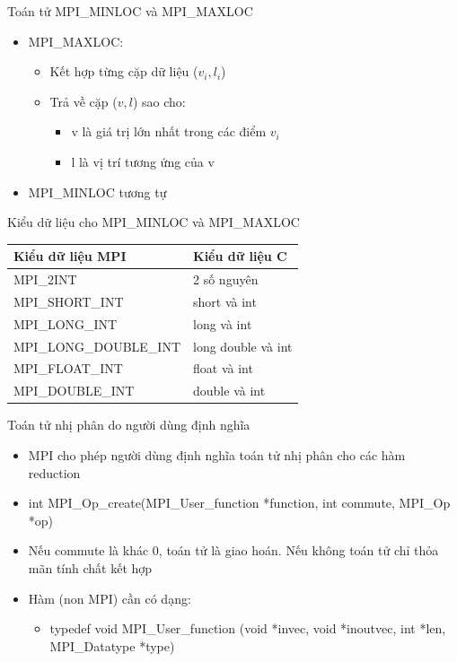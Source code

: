 \documentclass[10pt]{beamer}
\theoremstyle{remark}
\numberwithin{algocf}{section}
\numberwithin{equation}{section}
\numberwithin{dl}{section}
\numberwithin{figure}{section}
\begin{document}
\begin{frame}{Toán tử MPI\_MINLOC và MPI\_MAXLOC}
    \begin{itemize}
        \item MPI\_MAXLOC:
        \begin{itemize}
            \item Kết hợp từng cặp dữ liệu ($v_i, l_i$)
            \item Trả về cặp ($v, l$) sao cho:
            \begin{itemize}
                \item v là giá trị lớn nhất trong các điểm $v_i$
                \item l là vị trí tương ứng của v
            \end{itemize}
        \end{itemize}
        \item MPI\_MINLOC tương tự
    \end{itemize}
\end{frame}

\begin{frame}{Kiểu dữ liệu cho MPI\_MINLOC và MPI\_MAXLOC}
    \begin{table}[H]
        \centering
        \begin{tabular}{ll}
            \hline
            Kiểu dữ liệu MPI & Kiểu dữ liệu C \\
            \hline
            MPI\_2INT & 2 số nguyên \\
            MPI\_SHORT\_INT & short và int \\
            MPI\_LONG\_INT & long và int \\
            MPI\_LONG\_DOUBLE\_INT & long double và int \\
            MPI\_FLOAT\_INT & float và int \\
            MPI\_DOUBLE\_INT & double và int \\
        \end{tabular}
    \end{table}
\end{frame}

\begin{frame}{Toán tử nhị phân do người dùng định nghĩa}
    \begin{itemize}
        \item MPI cho phép người dùng định nghĩa toán tử nhị phân cho các hàm reduction
        \item int MPI\_Op\_create(MPI\_User\_function *function, int commute,
                            MPI\_Op *op)
        \item Nếu commute là khác 0, toán tử là giao hoán. Nếu không toán tử chỉ thỏa mãn tính chất kết hợp
        \item Hàm (non MPI) cần có dạng:
        \begin{itemize}
            \item typedef void MPI\_User\_function (void *invec, void *inoutvec,
                                                    int *len, MPI\_Datatype *type) 
        \end{itemize}
    \end{itemize}
\end{frame}
\end{document}
